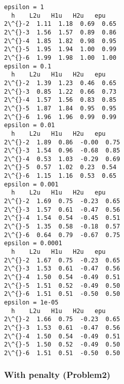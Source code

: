 \documentclass[11pt]{article}
\begin{document}
    \begin{Verbatim}[commandchars=\\\{\}]
epsilon = 1
  h    L2u   H1u   H2u   epu
2\^{}-2  1.11  1.18  0.69  0.65
2\^{}-3  1.56  1.57  0.89  0.86
2\^{}-4  1.85  1.82  0.98  0.95
2\^{}-5  1.95  1.94  1.00  0.99
2\^{}-6  1.99  1.98  1.00  1.00
epsilon = 0.1
  h    L2u   H1u   H2u   epu
2\^{}-2  1.39  1.23  0.46  0.65
2\^{}-3  0.85  1.22  0.66  0.73
2\^{}-4  1.57  1.56  0.83  0.85
2\^{}-5  1.87  1.84  0.95  0.95
2\^{}-6  1.96  1.96  0.99  0.99
epsilon = 0.01
  h    L2u   H1u   H2u   epu
2\^{}-2  1.89  0.86  -0.00  0.75
2\^{}-3  1.54  0.96  -0.68  0.85
2\^{}-4  0.53  1.03  -0.29  0.69
2\^{}-5  0.57  1.02  0.23  0.54
2\^{}-6  1.15  1.16  0.53  0.65
epsilon = 0.001
  h    L2u   H1u   H2u   epu
2\^{}-2  1.69  0.75  -0.23  0.65
2\^{}-3  1.57  0.61  -0.47  0.56
2\^{}-4  1.54  0.54  -0.45  0.51
2\^{}-5  1.35  0.58  -0.18  0.57
2\^{}-6  0.64  0.79  -0.67  0.75
epsilon = 0.0001
  h    L2u   H1u   H2u   epu
2\^{}-2  1.67  0.75  -0.23  0.65
2\^{}-3  1.53  0.61  -0.47  0.56
2\^{}-4  1.50  0.54  -0.49  0.51
2\^{}-5  1.51  0.52  -0.49  0.50
2\^{}-6  1.51  0.51  -0.50  0.50
epsilon = 1e-05
  h    L2u   H1u   H2u   epu
2\^{}-2  1.66  0.75  -0.23  0.65
2\^{}-3  1.53  0.61  -0.47  0.56
2\^{}-4  1.50  0.54  -0.49  0.51
2\^{}-5  1.50  0.52  -0.49  0.50
2\^{}-6  1.51  0.51  -0.50  0.50
    \end{Verbatim}

    \subsubsection{With penalty (Problem2)}\label{with-penalty-problem2}
\end{document}
